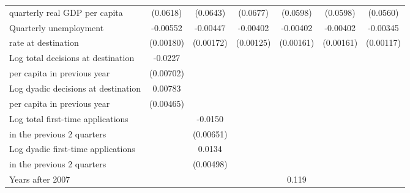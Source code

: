 \begin{table}[!ht]
\begin{tabular}{l*{6}{c}}
 quarterly real GDP per capita                    &    (0.0618)         &    (0.0643)         &    (0.0677)         &    (0.0598)         &    (0.0598)         &    (0.0560)         \\
[0,5em]
Quarterly unemployment &    -0.00552\sym{**} &    -0.00447\sym{*}  &    -0.00402\sym{**} &    -0.00402\sym{*}  &    -0.00402\sym{*}  &    -0.00345\sym{**} \\
rate at destination                    &   (0.00180)         &   (0.00172)         &   (0.00125)         &   (0.00161)         &   (0.00161)         &   (0.00117)         \\
[0,5em]
Log total decisions at destination &     -0.0227\sym{**} &                     &                     &                     &                     &                     \\
per capita in previous year                    &   (0.00702)         &                     &                     &                     &                     &                     \\
[0,5em]
Log dyadic decisions at destination&     0.00783         &                     &                     &                     &                     &                     \\
 per capita in previous year                    &   (0.00465)         &                     &                     &                     &                     &                     \\
[0,5em]
Log total first-time applications&                     &     -0.0150\sym{*}  &                     &                     &                     &                     \\
 in the previous 2 quarters                    &                     &   (0.00651)         &                     &                     &                     &                     \\
[0,5em]
Log dyadic first-time applications &                     &      0.0134\sym{**} &                     &                     &                     &                     \\
in the previous 2 quarters                    &                     &   (0.00498)         &                     &                     &                     &                     \\
[0,5em]
Years after 2007    &                     &                     &                     &       0.119\sym{***}&                     &                     \\

\end{tabular}
\end{table}
